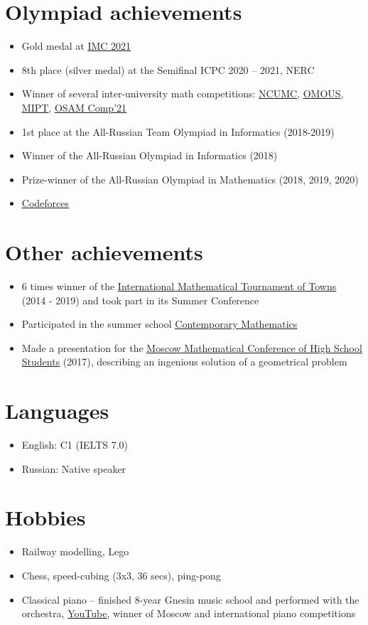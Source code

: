 \documentclass[letterpaper,11pt]{article}
\newcommand{\resumeItemListStart}{\begin{itemize}}
\newcommand{\resumeItemListEnd}{\end{itemize}\vspace{-8pt}}
\newcommand{\resumeItem}[1]{\item\small{{#1 \vspace{-2pt}}}}
\newcommand{\resumeSubItem}[1]{\resumeItem{#1}\vspace{-4pt}}
\begin{document}
\section{Olympiad achievements}
    \resumeItemListStart
        \resumeSubItem{Gold medal at \href{https://imc-math.org.uk/?year=2021}{\underline{IMC 2021}}}
        \resumeSubItem{8th place (silver medal) at the Semifinal ICPC 2020 – 2021, NERC}
        \resumeSubItem{Winner of several inter-university math competitions: \href{https://iuhd.edu.tm/competition/44}{\underline{NCUMC}}, \href{https://iuhd.edu.tm/competition/45}{\underline{OMOUS}}, \href{http://www.rkarasev.ru/note/66}{\underline{MIPT}}, \href{https://cs.hse.ru/en/announcements/504365867.html}{\underline{OSAM Comp'21}}}
        \resumeSubItem{1st place at the All-Russian Team Olympiad in Informatics (2018-2019)}
        \resumeSubItem{Winner of the All-Russian Olympiad in Informatics (2018)}
        \resumeSubItem{Prize-winner of the All-Russian Olympiad in Mathematics (2018, 2019, 2020)}
        \resumeSubItem{\href{https://codeforces.com/profile/Kuyan}{\underline{Codeforces}}}
    \resumeItemListEnd


\section{Other achievements}
    \resumeItemListStart
        \resumeSubItem{6 times winner of the \href{https://www.turgor.ru/en/}{\underline{International Mathematical Tournament of Towns}} (2014 - 2019) and took part in its Summer Conference}
        \resumeSubItem{Participated in the summer school \href{https://www.mccme.ru/dubna/eng/}{\underline{Contemporary Mathematics}}}
        \resumeSubItem{Made a presentation for the \href{https://mccme.ru/mmks/index_eng.htm}{\underline{Moscow Mathematical Conference of High School Students}} (2017), describing an ingenious solution of a geometrical problem}
    \resumeItemListEnd


\section{Languages}
    \resumeItemListStart
        \resumeSubItem{English: C1 (IELTS 7.0)}
        \resumeSubItem{Russian: Native speaker}
    \resumeItemListEnd


\section{Hobbies}
    \resumeItemListStart
        \resumeSubItem{Railway modelling, Lego}
        \resumeSubItem{Chess, speed-cubing (3x3, 36 secs), ping-pong}
        \resumeSubItem{Classical piano -- finished 8-year Gnesin music school and performed with the orchestra, \href{https://www.youtube.com/user/FeodorKuyanov/playlists}{\underline{YouTube}}, winner of Moscow and international piano competitions}
    \resumeItemListEnd
\end{document}

